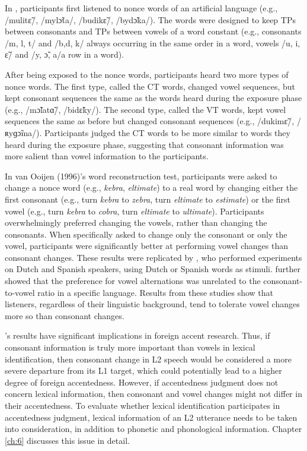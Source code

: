 In \citet{Bonatti_2005}, participants first listened to nonce words of an artificial language (e.g., /mulitɛ̃/, /mylɔ̃ta/, /budikɛ̃/, /bydɔ̃ka/). The words were designed to keep TPs between consonants and TPs between vowels of a word constant (e.g., consonants /m, l, t/ and /b,d, k/ always occurring in the same order in a word, vowels /u, i, ɛ̃/ and /y, ɔ̃, a/a row in a word).

After being exposed to the nonce words, participants heard two more types of nonce words. The first type, called the CT words, changed vowel sequences, but kept consonant sequences the same as the words heard during the exposure phase (e.g., /mɔ̃latɑ̃/, /bidɛ̃ky/). The second type, called the VT words, kept vowel sequences the same as before but changed consonant sequences (e.g., /dukimɛ̃/, /ʀyɡɔ̃ma/). Participants judged the CT words to be more similar to words they heard during the exposure phase, suggesting that consonant information was more salient than vowel information to the participants. 

 In van Ooijen (1996)’s word reconstruction test, participants were asked to change a nonce word (e.g., \textit{kebra}, \textit{eltimate}) to a real word by changing either the first consonant (e.g., turn \textit{kebra} to \textit{zebra}, turn \textit{eltimate} to \textit{estimate}) or the first vowel (e.g., turn \textit{kebra} to \textit{cobra}, turn \textit{eltimate} to \textit{ultimate}). Participants overwhelmingly preferred changing the vowels, rather than changing the consonants. When specifically asked to change only the consonant or only the vowel, participants were significantly better at performing vowel changes than consonant changes. These results were replicated by \citep{Cutler_2000}, who performed experiments on Dutch and Spanish speakers, using Dutch or Spanish words as stimuli. \citet{Cutler_2000} further showed that the preference for vowel alternations was unrelated to the consonant-to-vowel ratio in a specific language. Results from these studies show that listeners, regardless of their linguistic background, tend to tolerate vowel changes more so than consonant changes.

\citet{Bonatti_2005, Van_Ooijen_1996}’s results have significant implications in foreign accent research. Thus, if consonant information is truly more important than vowels in lexical identification, then consonant change in L2 speech would be considered a more severe departure from its L1 target, which could potentially lead to a higher degree of foreign accentedness. However, if accentedness judgment does not concern lexical information, then consonant and vowel changes might not differ in their accentedness. To evaluate whether lexical identification participates in accentedness judgment, lexical information of an L2 utterance needs to be taken into consideration, in addition to phonetic and phonological information. Chapter \ref{ch:6} discusses this issue in detail.

